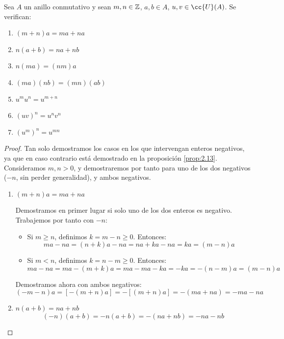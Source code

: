 \begin{prop}
    Sea $A$ un anillo conmutativo y sean $m,n \in \mathbb Z$, $a,b \in A$, $u,v \in \cc{U}(A)$. Se verifican:
    \begin{enumerate}
        \item $(m+n)a = ma+na$
        \item $n(a+b) = na + nb$
        \item $n(ma) = (nm)a$
        \item $(ma)(nb) = (mn)(ab)$
        \item $u^mu^n = u^{m+n}$
        \item $(uv)^n = u^nv^n$
        \item $(u^m)^n = u^{mn}$
    \end{enumerate}
\end{prop}
\begin{proof} Tan solo demostramos los casos en los que intervengan enteros negativos, ya que en caso contrario está demostrado en la proposición \ref{prop:2.13}. Consideramos $m,n>0$, y demostraremos por tanto para uno de los dos negativos ($-n$, sin perder generalidad), y ambos negativos.
    \begin{enumerate}
        \item $(m+n)a = ma+na$

        Demostramos en primer lugar si solo uno de los dos enteros es negativo. Trabajemos por tanto con $-n$:
        \begin{itemize}
            \item Si $m\geq n$, definimos $k=m-n\geq 0$. Entonces:
            \begin{equation*}
                ma-na = (n+k)a - na = na + ka -na = ka = (m-n)a
            \end{equation*}

            \item Si $m< n$, definimos $k=n-m\geq 0$. Entonces:
            \begin{equation*}
                ma-na = ma -(m+k)a = ma - ma -ka = -ka = -(n-m)a = (m-n)a
            \end{equation*}
        \end{itemize}

        Demostramos ahora con ambos negativos:
        \begin{equation*}
            (-m-n)a = [-(m+n)a] = -[(m+n)a] = -(ma+na) = -ma - na
        \end{equation*}
        
        \item $n(a+b) = na + nb$
        \begin{equation*}
            (-n)(a+b) = -n(a+b) = -(na+nb) = -na -nb
        \end{equation*}
        

\end{enumerate}
\end{proof}
